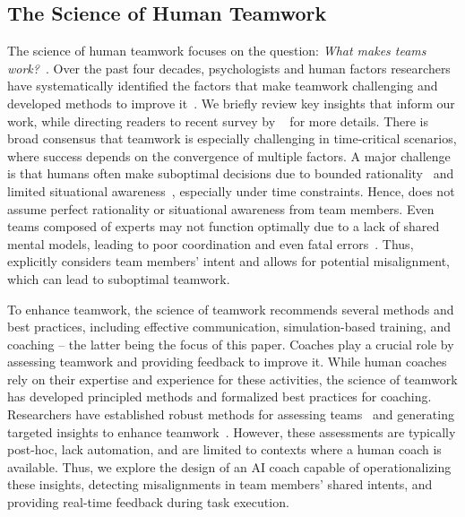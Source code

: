 \subsection{The Science of Human Teamwork}
\label{sec: team training}

The science of human teamwork focuses on the question: \textit{What makes teams work?}~\cite{salas2018science}.
Over the past four decades, psychologists and human factors researchers have systematically identified the factors that make teamwork challenging and developed methods to improve it~\cite{salas2008teams,cooke2013interactive,cooke2021effective,salas2024science}.
We briefly review key insights that inform our work, while directing readers to recent survey by ~\citet{tannenbaum2020teams} for more details.
There is broad consensus that teamwork is especially challenging in time-critical scenarios, where success depends on the convergence of multiple factors.
A major challenge is that humans often make suboptimal decisions due to bounded rationality~\cite{simon1997models, kahneman2003maps, kahneman2013prospect} and limited situational awareness~\cite{endsley2000situation, parush2011communication, stanton2017state, endsley2021situation}, especially under time constraints.
Hence, \coach does not assume perfect rationality or situational awareness from team members.
Even teams composed of experts may not function optimally due to a lack of shared mental models, leading to poor coordination and even fatal errors~\cite{cannon1993shared, mathieu2000influence, jonker2010shared, van2011team, mccomb2014concept, harari2024misalignment}.
Thus, \coach explicitly considers team members' intent and allows for potential misalignment, which can lead to suboptimal teamwork.

To enhance teamwork, the science of teamwork recommends several methods and best practices, including effective communication, simulation-based training, and coaching -- the latter being the focus of this paper. Coaches play a crucial role by assessing teamwork and providing feedback to improve it. While human coaches rely on their expertise and experience for these activities, the science of teamwork has developed principled methods and formalized best practices for coaching. Researchers have established robust methods for assessing  teams~\cite{salas2018science,granaasen2019towards,costar2020improving,grimm2023dynamical,kennedy2024novel} and generating targeted insights to enhance teamwork~\cite{hackman2005theory, salas2008does, peters2013team, weaver2014team, britton2015expanding}. However, these assessments are typically post-hoc, lack automation, and are limited to contexts where a human coach is available. Thus, we explore the design of an AI coach capable of operationalizing these insights, detecting misalignments in team members' shared intents, and providing real-time feedback during task execution. 
